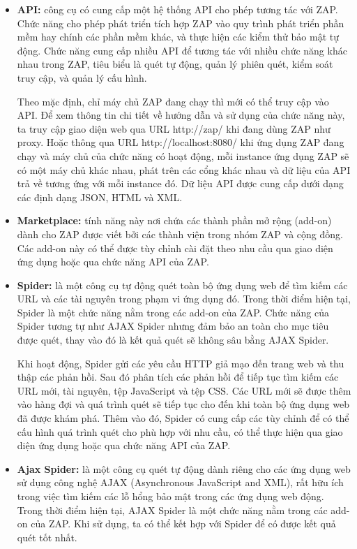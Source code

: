 \begin{itemize}
  \item \textbf{API:} công cụ có cung cấp một hệ thống API cho phép tương tác với ZAP.
        Chức năng cho phép phát triển tích hợp ZAP vào quy trình phát triển phần mềm hay chính các phần mềm khác, và thực hiện các kiểm thử bảo mật tự động.
        Chức năng cung cấp nhiều API để tương tác với nhiều chức năng khác nhau trong ZAP, tiêu biểu là quét tự động, quản lý phiên quét, kiểm soát truy cập, và quản lý cấu hình.
        \par
        Theo mặc định, chỉ máy chủ ZAP đang chạy thì mới có thể truy cập vào API.
        Để xem thông tin chi tiết về hướng dẫn và sử dụng của chức năng này, ta truy cập giao diện web qua URL http://zap/ khi đang dùng ZAP như proxy.
        Hoặc thông qua URL http://localhost:8080/ khi ứng dụng ZAP đang chạy và máy chủ của chức năng có hoạt động, mỗi instance ứng dụng ZAP sẽ có một máy chủ khác nhau, phát trên các cổng khác nhau và dữ liệu của API trả về tương ứng với mỗi instance đó.
        Dữ liệu API được cung cấp dưới dạng các định dạng JSON, HTML và XML.
  \item \textbf{Marketplace:} tính năng này nơi chứa các thành phần mở rộng (add-on) dành cho ZAP được viết bởi các thành viện trong nhóm ZAP và cộng đồng. Các add-on này có thể được tùy chỉnh cài đặt theo nhu cầu qua giao diện ứng dụng hoặc qua chức năng API của ZAP.
  \item \textbf{Spider:} là một công cụ tự động quét toàn bộ ứng dụng web để tìm kiếm các URL và các tài nguyên trong phạm vi ứng dụng đó. Trong thời điểm hiện tại, Spider là một chức năng nằm trong các add-on của ZAP. Chức năng của Spider tương tự như AJAX Spider nhưng đảm bảo an toàn cho mục tiêu được quét, thay vào đó là kết quả quét sẽ không sâu bằng AJAX Spider.
        \par
        Khi hoạt động, Spider gửi các yêu cầu HTTP giả mạo đến trang web và thu thập các phản hồi. Sau đó phân tích các phản hồi để tiếp tục tìm kiếm các URL mới, tài nguyên, tệp JavaScript và tệp CSS. Các URL mới sẽ được thêm vào hàng đợi và quá trình quét sẽ tiếp tục cho đến khi toàn bộ ứng dụng web đã được khám phá. Thêm vào đó, Spider có cung cấp các tùy chỉnh để có thể cấu hình quá trình quét cho phù hợp với nhu cầu, có thể thực hiện qua giao diện ứng dụng hoặc qua chức năng API của ZAP.
  \item \textbf{Ajax Spider:} là một công cụ quét tự động dành riêng cho các ứng dụng web sử dụng công nghệ AJAX (Asynchronous JavaScript and XML), rất hữu ích trong việc tìm kiếm các lỗ hổng bảo mật trong các ứng dụng web động. Trong thời điểm hiện tại, AJAX Spider là một chức năng nằm trong các add-on của ZAP. Khi sử dụng, ta có thể kết hợp với Spider để có được kết quả quét tốt nhất.

\end{itemize}
